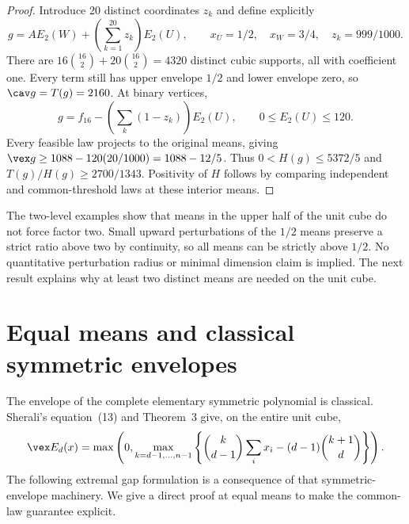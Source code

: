 \begin{proof}
Introduce 20 distinct coordinates $z_k$ and define explicitly
\begin{equation}\label{eq:unit-52}
 g=A E_2(W)+\left(\sum_{k=1}^{20}z_k\right)E_2(U),
 \qquad x_U=1/2,\quad x_W=3/4,\quad z_k=999/1000.
\end{equation}
There are $16\binom{16}{2}+20\binom{16}{2}=4320$ distinct cubic
supports, all with coefficient one. Every term still has upper envelope
$1/2$ and lower envelope zero, so $\cav g=T(g)=2160$. At binary vertices,
\[
 g=f_{16}-\left(\sum_k(1-z_k)\right)E_2(U),\qquad
 0\le E_2(U)\le120.
\]
Every feasible law projects to the original means, giving
$\vex g\ge1088-120(20/1000)=1088-12/5$.
Thus $0<H(g)\le5372/5$ and $T(g)/H(g)\ge2700/1343$.
Positivity of $H$ follows by comparing independent and common-threshold
laws at these interior means.
\end{proof}

The two-level examples show that means in the upper half of the unit
cube do not force factor two. Small upward perturbations of the $1/2$
means preserve a strict ratio above two by continuity, so all means can
be strictly above $1/2$. No quantitative perturbation radius or minimal
dimension claim is implied. The next result explains why at least two
distinct means are needed on the unit cube.

\section{Equal means and classical symmetric envelopes}\label{sec:equal-means}
The envelope of the complete elementary symmetric polynomial is classical.
Sherali's equation~(13) and Theorem~3 \citep[pp.~252--253]{Sherali1997}
give, on the entire unit cube,
\begin{equation}\label{eq:sherali-symmetric}
 \vex E_d(x)=\max\left(0,
  \max_{k=d-1,\ldots,n-1}
  \left\{\binom{k}{d-1}\sum_i x_i-(d-1)\binom{k+1}{d}\right\}\right).
\end{equation}
The following extremal gap formulation is a consequence of that
symmetric-envelope machinery. We give a direct proof at equal means to
make the common-law guarantee explicit.

